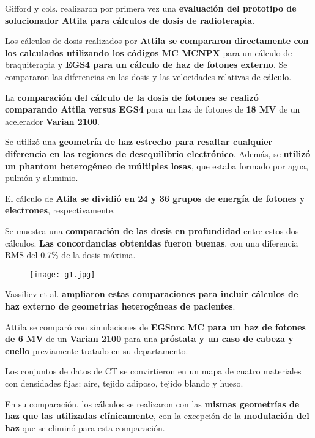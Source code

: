 \documentclass[aspectratio=169,xcolor=dvipsnames,t]{beamer}
\begin{document}
\begin{frame}

    Gifford y cols. realizaron por primera vez una \textbf{evaluación del prototipo de solucionador Attila para cálculos de dosis de radioterapia}. 
    
    Los cálculos de dosis realizados por \textbf{Attila se compararon directamente con los calculados utilizando los códigos MC MCNPX} para un cálculo de braquiterapia y \textbf{EGS4 para un cálculo de haz de fotones externo}. Se compararon las diferencias en las dosis y las velocidades relativas de cálculo.

    La \textbf{comparación del cálculo de la dosis de fotones se realizó comparando Attila versus EGS4} para un haz de fotones de \textbf{18 MV} de un acelerador \textbf{Varian 2100}.

    Se utilizó una \textbf{geometría de haz estrecho para resaltar cualquier diferencia en las regiones de desequilibrio electrónico}. Además, se \textbf{utilizó un phantom heterogéneo de múltiples losas}, que estaba formado por agua, pulmón y aluminio. 
    
    El cálculo de \textbf{Atila se dividió en 24 y 36 grupos de energía de fotones y electrones}, respectivamente. 

\end{frame}

\begin{frame}

    Se muestra una \textbf{comparación de las dosis en profundidad} entre estos dos cálculos. \textbf{Las concordancias obtenidas fueron buenas}, con una diferencia RMS del 0.7\% de la dosis máxima.

    \begin{figure}
        \centering
        \texttt{[image: g1.jpg]}
    \end{figure}

\end{frame}

\begin{frame}

    \vspace{1cm}

    Vassiliev et al. \textbf{ampliaron estas comparaciones para incluir cálculos de haz externo de geometrías heterogéneas de pacientes}. 

    Attila se comparó con simulaciones de \textbf{EGSnrc MC para un haz de fotones de 6 MV} de un \textbf{Varian 2100} para una \textbf{próstata y un caso de cabeza y cuello} previamente tratado en su departamento. 

    Los conjuntos de datos de CT se convirtieron en un mapa de cuatro materiales con densidades fijas: aire, tejido adiposo, tejido blando y hueso. 

    En su comparación, los cálculos se realizaron con las \textbf{mismas geometrías de haz que las utilizadas clínicamente}, con la excepción de la \textbf{modulación del haz} que se eliminó para esta comparación.

\end{frame}
\end{document}
